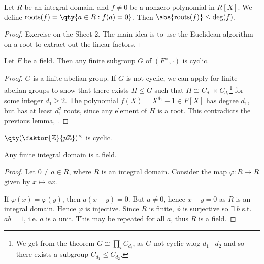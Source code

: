 \begin{lemma} \label{lem:9.2}
	Let $R$ be an integral domain, and $f \neq 0$ be a nonzero polynomial in $R[X]$.
	We define $\mathrm{roots}(f) = \qty{a \in R : f(a) = 0}$.
	Then $\abs{\mathrm{roots}(f)} \leq \mathrm{deg}(f)$.
\end{lemma}

\begin{proof}
	Exercise on the Sheet 2.
	The main idea is to use the Euclidean algorithm on a root to extract out the linear factors.
\end{proof}

\begin{theorem} \label{thm:9.3}
	Let $F$ be a field.
	Then any finite subgroup $G$ of $(F^\times, \cdot)$ is cyclic.
\end{theorem}

\begin{proof}
	$G$ is a finite abelian group.
	If $G$ is not cyclic, we can apply  for finite abelian groups to show that there exists $H \leq G$ such that $H \cong C_{d_1} \times C_{d_1}$\footnote{We get from the theorem $G \cong \prod_i C_{d_i}$, as $G$ not cyclic wlog $d_1 \mid d_2$ and so there exists a subgroup $C_{d_1} \leq C_{d_2}$.} for some integer $d_1 \geq 2$.
	The polynomial $f(X) = X^{d_1} - 1 \in F[X]$ has degree $d_1$, but has at least $d_1^2$ roots, since any element of $H$ is a root.
	This contradicts the previous lemma, .
\end{proof}

\begin{example}
	$\qty(\faktor{\mathbb Z}{p\mathbb Z})^\times$ is cyclic.
\end{example}

\begin{proposition} \label{prp:9.4}
	Any finite integral domain is a field.
\end{proposition}

\begin{proof}
	Let $0 \neq a \in R$, where $R$ is an integral domain.
	Consider the map $\varphi : R \to R$ given by $x \mapsto ax$.

	If $\varphi(x) = \varphi(y)$, then $a(x-y) = 0$.
	But $a \neq 0$, hence $x - y = 0$ as $R$ is an integral domain.
	Hence $\varphi$ is injective.
	Since $R$ is finite, $\phi$ is surjective so $\exists \; b$ s.t. $ab = 1$, i.e. $a$ is a unit.
	This may be repeated for all $a$, thus $R$ is a field.
\end{proof}

